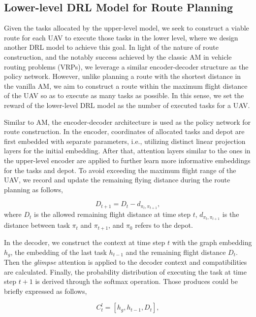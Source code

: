 \documentclass[lettersize,journal]{IEEEtran}
\begin{document}
	\subsection{Lower-level DRL Model for Route Planning}
	
	Given the tasks allocated by the upper-level model, we seek to construct a viable route for each UAV to execute those tasks in the lower level, where we design another DRL model to achieve this goal. In light of the nature of route construction, and the notably success achieved by the classic AM \cite{koolATTENTIONLEARNSOLVE2019a} in vehicle routing problems (VRPs), we leverage a similar encoder-decoder structure as the policy network. However, unlike planning a route with the shortest distance in the vanilla AM, we aim to construct a route within the maximum flight distance of the UAV so as to execute as many tasks as possible. In this sense, we set the reward of the lower-level DRL model as the number of executed tasks for a UAV.
	
	Similar to AM, the encoder-decoder architecture is used as the policy network for route construction. In the encoder, coordinates of allocated tasks and depot are first embedded with separate parameters, i.e., utilizing distinct linear projection layers for the initial embedding. After that, attention layers similar to the ones in the upper-level encoder are applied to further learn more informative embeddings for the tasks and depot. To avoid exceeding the maximum flight range of the UAV, we record and update the remaining flying distance during the route planning as follows,
	
	\begin{equation}
		D_{t+1}=D_t-d_{\pi_{t},\pi_{t+1}},
	\end{equation}
	where $D_t$ is the allowed remaining flight distance at time step $t$, $d_{\pi_{t},\pi_{t+1}}$ is the distance between task $\pi_{t}$ and $\pi_{t+1}$, and $\pi_0$ refers to the depot.
	
	In the decoder, we construct the context at time step $t$ with the graph embedding $h_g$, the embedding of the last task $h_{t-1}$ and the remaining flight distance $D_t$. Then the \textit{glimpse} attention \cite{belloNeuralCombinatorialOptimization2017} is applied to the decoder context and compatibilities are calculated. Finally, the probability distribution of executing the task at time step $t+1$ is derived through the softmax operation. Those produces could be briefly expressed as follows,
	
	\begin{equation}
		C_t^l=\left[h_g,h_{t-1},D_t\right],
	\end{equation}
	
\end{document}
